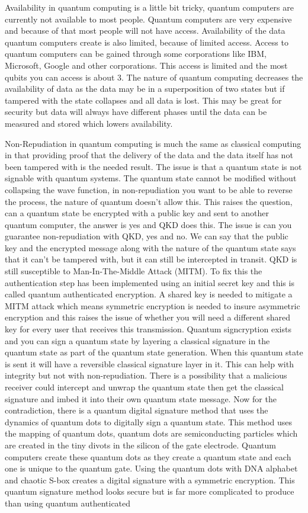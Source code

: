 \documentclass[sigconf]{acmart}
\begin{document}
Availability in quantum computing is a little bit tricky, quantum computers are currently not available to most people. Quantum computers are very expensive and because of that most people will not have access. Availability of the data quantum computers create is also limited, because of limited access. Access to quantum computers can be gained through some corporations like IBM, Microsoft, Google and other corporations. This access is limited and the most qubits you can access is about 3. The nature of quantum computing decreases the availability of data as the data may be in a superposition of two states but if tampered with the state collapses and all data is lost. This may be great for security but data will always have different phases until the data can be measured and stored which lowers availability.

Non-Repudiation in quantum computing is much the same as classical computing in that providing proof that the delivery of the data and the data itself has not been tampered with is the needed result. The issue is that a quantum state is not signable with quantum systems. The quantum state cannot be modified without collapsing the wave function, in non-repudiation you want to be able to reverse the process, the nature of quantum doesn’t allow this.  This raises the question, can a quantum state be encrypted with a public key and sent to another quantum computer, the answer is yes and QKD does this. The issue is can you guarantee non-repudiation with QKD, yes and no. We can say that the public key and the encrypted message along with the nature of the quantum state says that it can’t be tampered with, but it can still be intercepted in transit. QKD is still susceptible to Man-In-The-Middle Attack (MITM). To fix this the authentication step has been implemented using an initial secret key and this is called quantum authenticated encryption. A shared key is needed to mitigate a MITM attack which means symmetric encryption is needed to insure asymmetric encryption and this raises the issue of whether you will need a different shared key for every user that receives this transmission. Quantum signcryption exists and you can sign a quantum state by layering a classical signature in the quantum state as part of the quantum state generation. When this quantum state is sent it will have a reversible classical signature layer in it. This can help with integrity but not with non-repudiation. There is a possibility that a malicious receiver could intercept and unwrap the quantum state then get the classical signature and imbed it into their own quantum state message. Now for the contradiction, there is a quantum digital signature method that uses the dynamics of quantum dots to digitally sign a quantum state. This method uses the mapping of quantum dots, quantum dots are semiconducting particles which are created in the tiny divots in the silicon of the gate electrode. Quantum computers create these quantum dots as they create a quantum state and each one is unique to the quantum gate. Using the quantum dots with DNA alphabet and chaotic S-box creates a digital signature with a symmetric encryption. This quantum signature method looks secure but is far more complicated to produce than using quantum authenticated 
\end{document}
